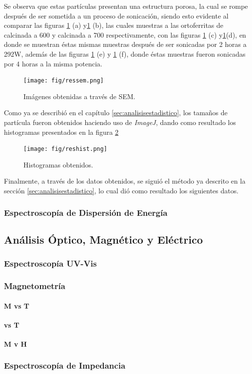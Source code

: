 \documentclass[../main.tex]{subfiles}
\begin{document}
Se observa que estas partículas presentan una estructura porosa, la cual se rompe después de ser sometida a un proceso de sonicación, siendo esto evidente al comparar las figuras \ref{fig:resSEM} (a) y\ref{fig:resSEM} (b), las cuales muestras a las ortoferritas de \neod{} calcinada a 600\gradoC{} y \sama{} calcinada a 700\gradoC{} respectivamente, con las figuras \ref{fig:resSEM} (c) y\ref{fig:resSEM}(d), en donde se muestran éstas mismas muestras después de ser sonicadas por 2 horas a 292W, además de las figuras \ref{fig:resSEM} (e) y \ref{fig:resSEM} (f), donde éstas muestras fueron sonicadas por 4 horas a la misma potencia.
\begin{figure}[H]
    \centering
    \texttt{[image: fig/ressem.png]}
    \caption{Imágenes obtenidas a través de SEM.}
    \label{fig:resSEM}
\end{figure}
Como ya se describió en el capítulo \ref{sec:analisisestadistico}, los tamaños de partícula fueron obtenidos haciendo uso de \textit{ImageJ}, dando como resultado los histogramas presentados en la figura \ref{fig:reshist}
\begin{figure}[H]
    \centering
    \texttt{[image: fig/reshist.png]}
    \caption{Histogramas obtenidos.}
    \label{fig:reshist}
\end{figure}
Finalmente, a través de los datos obtenidos, se siguió el método ya descrito en la sección \ref{sec:analisisestadistico}, lo cual dió como resultado los siguientes datos.
\subsubsection{Espectroscopía de Dispersión de Energía}

\subsection{Análisis Óptico, Magnético y Eléctrico} \label{sec:analisisoptmagelec}
\subsubsection{Espectroscopía UV-Vis}

\subsubsection{Magnetometría}

\paragraph{M vs T}

\paragraph{\textchi{} vs T}

\paragraph{M v H}
\subsubsection{Espectroscopía de Impedancia}
\end{document}
